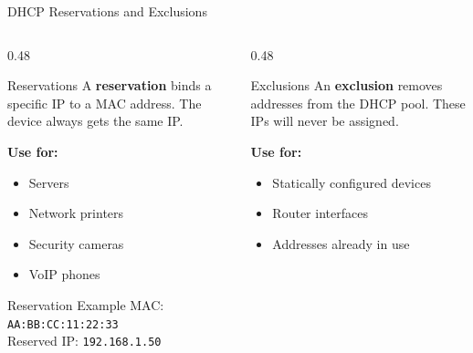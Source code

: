 \documentclass[aspectratio=169, 11pt]{beamer}
\newcommand{\keyterm}[1]{\textbf{\textcolor{rctcblue}{#1}}}
\begin{document}
\begin{frame}{DHCP Reservations and Exclusions}
    \begin{columns}[T]
        \begin{column}{0.48\textwidth}
            \begin{block}{Reservations}
                \small
                A \keyterm{reservation} binds a specific IP to a MAC address. The device always gets the same IP.
                
                \vspace{0.2em}
                \textbf{Use for:}
                \begin{itemize}\setlength{\itemsep}{1pt}
                    \item Servers
                    \item Network printers
                    \item Security cameras
                    \item VoIP phones
                \end{itemize}
            \end{block}
            
            \vspace{0.2em}
            \begin{exampleblock}{Reservation Example}
                \small
                MAC: \texttt{AA:BB:CC:11:22:33} \\
                Reserved IP: \texttt{192.168.1.50}
            \end{exampleblock}
        \end{column}
        \begin{column}{0.48\textwidth}
            \begin{block}{Exclusions}
                \small
                An \keyterm{exclusion} removes addresses from the DHCP pool. These IPs will never be assigned.
                
                \vspace{0.2em}
                \textbf{Use for:}
                \begin{itemize}\setlength{\itemsep}{1pt}
                    \item Statically configured devices
                    \item Router interfaces
                    \item Addresses already in use
                \end{itemize}
            \end{block}
            

\end{column}
\end{columns}
\end{frame}
\end{document}
